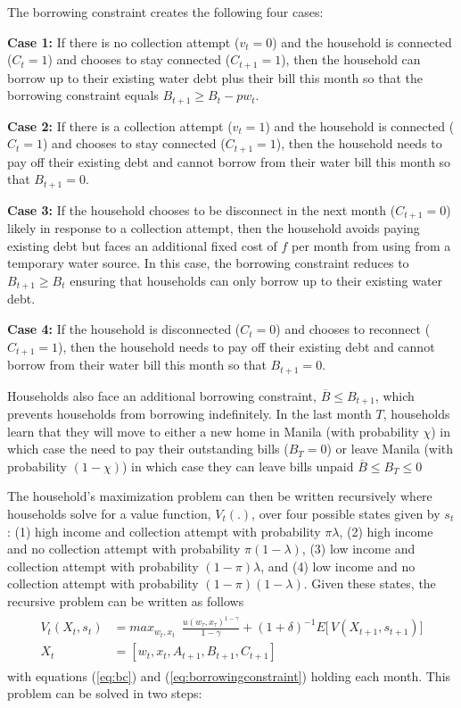 \documentclass[12pt]{article}
\begin{document}
The borrowing constraint creates the following four cases:

\textbf{Case 1:} If there is no collection attempt ($v_t=0$) and the household is connected ($C_{t}=1$) and chooses to stay connected ($C_{t+1}=1$), then the household can borrow up to their existing water debt plus their bill this month so that the borrowing constraint equals $B_{t+1}\geq B_t -  p w_t $.

\textbf{Case 2:} If there is a collection attempt ($v_t=1$) and the household is connected ($C_t=1$) and chooses to stay connected ($C_{t+1}=1$), then the household needs to pay off their existing debt and cannot borrow from their water bill this month so that $B_{t+1} = 0$.

\textbf{Case 3:} If the household chooses to be disconnect in the next month ($C_{t+1}=0$) likely in response to a collection attempt, then the household avoids paying existing debt but faces an additional fixed cost of $f$ per month from using from a temporary water source.  In this case, the borrowing constraint reduces to $ B_{t+1} \geq B_t$ ensuring that households can only borrow up to their existing water debt.  

\textbf{Case 4:} If the household is disconnected ($C_t=0$) and chooses to reconnect ($C_{t+1}=1$), then the household needs to pay off their existing debt and cannot borrow from their water bill this month so that $B_{t+1} = 0$.  

Households also face an additional borrowing constraint, $\overline{B} \leq B_{t+1}$, which prevents households from borrowing indefinitely.  In the last month $T$, households learn that they will move to either a new home in Manila (with probability $\chi$) in which case the need to pay their outstanding bills ($B_T=0$) or leave Manila (with probability $(1-\chi)$) in which case they can leave bills unpaid $\overline{B}\leq B_T \leq0$

The household's maximization problem can then be written recursively where households solve for a value function, $V_t(.)$, over four possible states given by $s_{t}$: (1) high income and collection attempt with probability $\pi\lambda$, (2) high income and no collection attempt with probability $\pi(1-\lambda)$, (3) low income and collection attempt with probability $(1-\pi)\lambda$, and (4) low income and no collection attempt with probability $(1-\pi)(1-\lambda)$.  Given these states, the recursive problem can be written as follows
\begin{align}
\label{eq:valmax}
\begin{split}
V_t(X_{t},s_t) &= max_{w_t,x_{t}} \,\,\, \frac{u(w_{\tau},x_{\tau})^{1-\gamma}}{1-\gamma}   + (1+\delta)^{-1}  E \Big[\, V(X_{t+1},s_{t+1})\Big] \\
X_t &= [w_t,x_t,A_{t+1},B_{t+1},C_{t+1}] 
\end{split}
\end{align}
with equations (\ref{eq:bc}) and (\ref{eq:borrowingconstraint}) holding each month.  This problem can be solved in two steps: 
\end{document}
